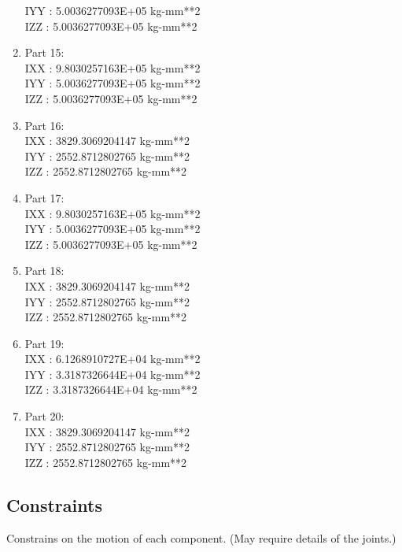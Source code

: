 \begin{enumerate}
                    IYY             : 5.0036277093E+05 kg-mm**2 \\
                    IZZ             : 5.0036277093E+05 kg-mm**2
                    \item Part 15: \\ IXX             : 9.8030257163E+05 kg-mm**2 \\
                    IYY             : 5.0036277093E+05 kg-mm**2 \\
                    IZZ             : 5.0036277093E+05 kg-mm**2
                    \item Part 16: \\ IXX             : 3829.3069204147 kg-mm**2 \\
                    IYY             : 2552.8712802765 kg-mm**2 \\
                    IZZ             : 2552.8712802765 kg-mm**2
                    \item Part 17: \\ IXX             : 9.8030257163E+05 kg-mm**2 \\
                    IYY             : 5.0036277093E+05 kg-mm**2 \\
                    IZZ             : 5.0036277093E+05 kg-mm**2
                    \item Part 18: \\ IXX             : 3829.3069204147 kg-mm**2 \\
                    IYY             : 2552.8712802765 kg-mm**2 \\
                    IZZ             : 2552.8712802765 kg-mm**2
                    \item Part 19: \\ IXX             : 6.1268910727E+04 kg-mm**2 \\
                    IYY             : 3.3187326644E+04 kg-mm**2 \\
                    IZZ             : 3.3187326644E+04 kg-mm**2
                    \item Part 20: \\ IXX             : 3829.3069204147 kg-mm**2 \\
                    IYY             : 2552.8712802765 kg-mm**2 \\
                    IZZ             : 2552.8712802765 kg-mm**2
                \end{enumerate}
                    
        \subsection{Constraints}
            Constrains on the motion of each component. (May require details of the joints.)

